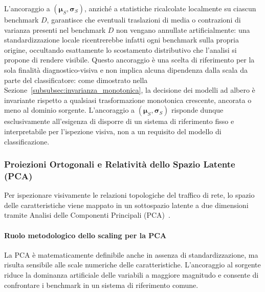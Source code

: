 L'ancoraggio a $(\boldsymbol{\mu}_S, \boldsymbol{\sigma}_S)$, anziché a statistiche ricalcolate localmente su ciascun benchmark $D$, garantisce che eventuali traslazioni di media o contrazioni di varianza presenti nel benchmark $D$ non vengano annullate artificialmente: una standardizzazione locale ricentrerebbe infatti ogni benchmark sulla propria origine, occultando esattamente lo scostamento distributivo che l'analisi si propone di rendere visibile. Questo ancoraggio è una scelta di riferimento per la sola finalità diagnostico-visiva e non implica alcuna dipendenza dalla scala da parte del classificatore: come dimostrato nella Sezione~\ref{subsubsec:invarianza_monotonica}, la decisione dei modelli ad albero è invariante rispetto a qualsiasi trasformazione monotonica crescente, ancorata o meno al dominio sorgente. L'ancoraggio a $(\boldsymbol{\mu}_S, \boldsymbol{\sigma}_S)$ risponde dunque esclusivamente all'esigenza di disporre di un sistema di riferimento fisso e interpretabile per l'ispezione visiva, non a un requisito del modello di classificazione.

\subsubsection{Proiezioni Ortogonali e Relatività dello Spazio Latente (PCA)}
\label{subsubsec:pca_relativita}
Per ispezionare visivamente le relazioni topologiche del traffico di rete, lo spazio delle caratteristiche viene mappato in un sottospazio latente a due dimensioni tramite Analisi delle Componenti Principali (PCA)~\cite{pearson1901, hotelling1933}.

\paragraph{Ruolo metodologico dello scaling per la PCA}
La PCA è matematicamente definibile anche in assenza di standardizzazione, ma risulta sensibile alle scale numeriche delle caratteristiche. L'ancoraggio al sorgente riduce la dominanza artificiale delle variabili a maggiore magnitudo e consente di confrontare i benchmark in un sistema di riferimento comune.

